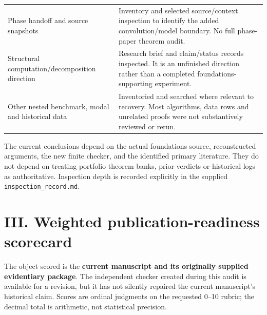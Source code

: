 \documentclass[
  10pt,
]{article}
\begin{document}
\begin{longtable}[]{@{}
  >{\raggedright\arraybackslash}p{}
  >{\raggedright\arraybackslash}p{}@{}}
Phase handoff and source snapshots & Inventory and selected
source/context inspection to identify the added convolution/model
boundary. No full phase-paper theorem audit. \\
Structural computation/decomposition direction & Research brief and
claim/status records inspected. It is an unfinished direction rather
than a completed foundations-supporting experiment. \\
Other nested benchmark, modal and historical data & Inventoried and
searched where relevant to recovery. Most algorithms, data rows and
unrelated proofs were not substantively reviewed or rerun. \\
\end{longtable}

The current conclusions depend on the actual foundations source,
reconstructed arguments, the new finite checker, and the identified
primary literature. They do not depend on treating portfolio theorem
banks, prior verdicts or historical logs as authoritative. Inspection
depth is recorded explicitly in the supplied
\texttt{inspection\_record.md}.

\section{III. Weighted publication-readiness
scorecard}\label{iii.-weighted-publication-readiness-scorecard}

The object scored is the \textbf{current manuscript and its originally
supplied evidentiary package}. The independent checker created during
this audit is available for a revision, but it has not silently repaired
the current manuscript's historical claim. Scores are ordinal judgments
on the requested 0--10 rubric; the decimal total is arithmetic, not
statistical precision.
\end{document}
